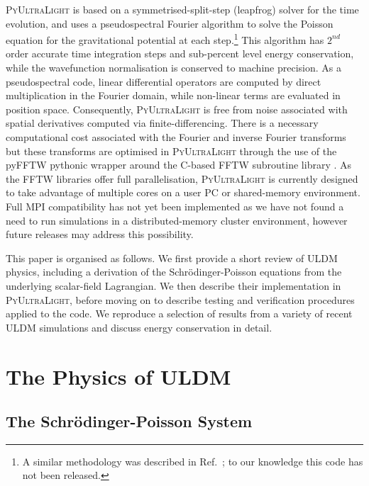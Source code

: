 \documentclass[a4paper,11pt]{article}
\newcommand{\PyUltraLight}{\textsc{PyUltraLight}\xspace}
\begin{document}
\PyUltraLight is based on a symmetrised-split-step (leapfrog) solver for the time evolution, and uses a pseudospectral Fourier algorithm to solve the Poisson equation for the gravitational potential at each step.\footnote{A similar methodology was described in Ref.~\cite{Paredes2016}; to our knowledge this code has not been released.} This algorithm has $2^{nd}$ order accurate time integration steps and sub-percent level energy conservation, while the wavefunction normalisation  is conserved to machine precision. As a pseudospectral code, linear differential operators are computed by direct multiplication in the Fourier domain, while non-linear terms are evaluated in position space. Consequently, \PyUltraLight is free from noise associated with spatial derivatives computed via finite-differencing. There is a necessary computational cost associated with the Fourier and inverse Fourier transforms but these transforms are optimised in \PyUltraLight through the use of the pyFFTW pythonic wrapper around the C-based FFTW subroutine library \cite{pyfftw,fftw}. As the FFTW libraries offer full parallelisation, \PyUltraLight is currently designed to take advantage of multiple cores on a user PC or shared-memory environment. Full MPI compatibility has not yet been implemented as we have not found a need to run simulations in a distributed-memory cluster environment, however future releases may address this possibility. 

This paper is organised as follows. We first provide a short review of ULDM physics, including a derivation of the Schr{\"o}dinger-Poisson equations from the underlying scalar-field Lagrangian. We then describe their implementation in \PyUltraLight, before moving on to describe testing and verification procedures applied to the code. We reproduce a selection of results from a variety of recent ULDM simulations and discuss energy conservation in detail. 


\section{The Physics of ULDM}\label{sec:physics}

\subsection{The Schr{\"o}dinger-Poisson System}
\end{document}
